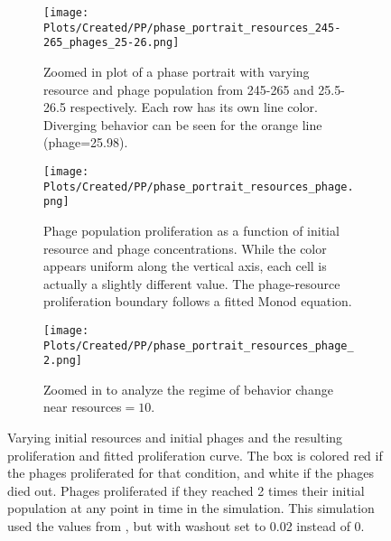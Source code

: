 \begin{figure}[]
    \centering
    \begin{subfigure}{0.49\linewidth}
        \centering
        \texttt{[image: Plots/Created/PP/phase\_portrait\_resources\_245-265\_phages\_25-26.png]}
        \caption{
            Zoomed in plot of a phase portrait with varying resource and phage population from 245-265 and 25.5-26.5 respectively. 
            Each row has its own line color. 
            Diverging behavior can be seen for the orange line (phage=25.98). 
        }
        \label{fig:created:phase_portrait_resources_245-265_phages_25-26}
    \end{subfigure}
    \hfill
    \begin{subfigure}{0.49\linewidth}
        \centering
        \texttt{[image: Plots/Created/PP/phase\_portrait\_resources\_phage.png]}
        \caption{
            Phage population proliferation as a function of initial resource and phage concentrations. 
            While the color appears uniform along the vertical axis, each cell is actually a slightly different value. 
            The phage-resource proliferation boundary follows a fitted Monod equation.
        }
        \label{fig:created:phase_portrait_resources_phage}
    \end{subfigure}
    \hfill
    \begin{subfigure}{0.49\linewidth}
        \centering
        \texttt{[image: Plots/Created/PP/phase\_portrait\_resources\_phage\_2.png]}
        \caption{
            Zoomed in to analyze the regime of behavior change near resources$=10$. 
        }
        \label{fig:created:phase_portrait_resources_phage_2}
    \end{subfigure}
    \caption{
        Varying initial resources and initial phages and the resulting proliferation and fitted proliferation curve. 
        The box is colored red if the phages proliferated for that condition, and white if the phages died out. 
        Phages proliferated if they reached 2 times their initial population at any point in time in the simulation. 
        This simulation used the values from , but with washout set to 0.02 instead of 0. 
    }
    \label{fig:created:phase_portrait_resource_phage_proliferate}
\end{figure}

